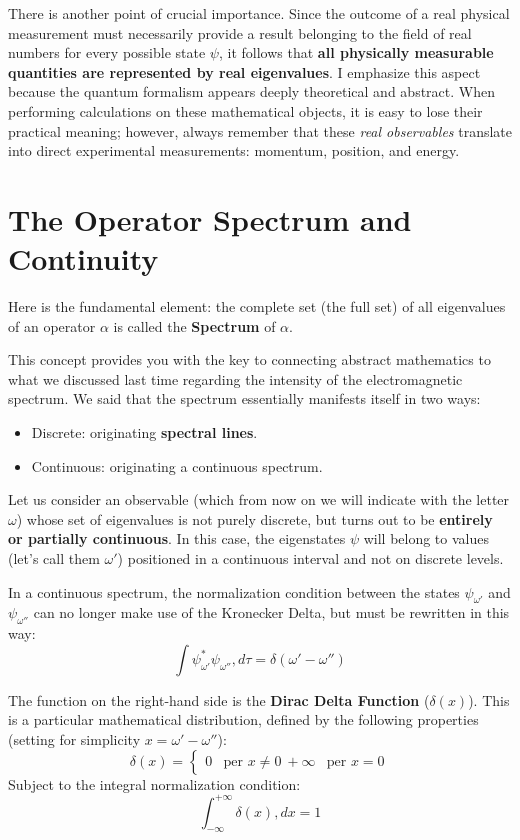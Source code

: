 There is another point of crucial importance. Since the outcome of a real physical measurement must necessarily provide a result belonging to the field of real numbers for every possible state $\psi$, it follows that \textbf{all physically measurable quantities are represented by real eigenvalues}.
I emphasize this aspect because the quantum formalism appears deeply theoretical and abstract. When performing calculations on these mathematical objects, it is easy to lose their practical meaning; however, always remember that these \textit{real observables} translate into direct experimental measurements: momentum, position, and energy.

\section{The Operator Spectrum and Continuity}

Here is the fundamental element: the complete set (the full set) of all eigenvalues of an operator $\alpha$ is called the \textbf{Spectrum} of $\alpha$.

This concept provides you with the key to connecting abstract mathematics to what we discussed last time regarding the intensity of the electromagnetic spectrum. We said that the spectrum essentially manifests itself in two ways:
\begin{itemize}
\item Discrete: originating \textbf{spectral lines}.
\item Continuous: originating a continuous spectrum.
\end{itemize}

Let us consider an observable (which from now on we will indicate with the letter $\omega$) whose set of eigenvalues is not purely discrete, but turns out to be \textbf{entirely or partially continuous}.
In this case, the eigenstates $\psi$ will belong to values (let's call them $\omega'$) positioned in a continuous interval and not on discrete levels.

In a continuous spectrum, the normalization condition between the states $\psi_{\omega'}$ and $\psi_{\omega''}$ can no longer make use of the Kronecker Delta, but must be rewritten in this way:
\begin{equation}
\int \psi_{\omega'}^* \psi_{\omega''} , d\tau = \delta(\omega' - \omega'')
\end{equation}

The function on the right-hand side is the \textbf{Dirac Delta Function} ($\delta(x)$).
This is a particular mathematical distribution, defined by the following properties (setting for simplicity $x = \omega' - \omega''$):
\begin{equation}
\delta(x) =
\begin{cases}
0 & \text{per } x \neq 0 \
+\infty & \text{per } x = 0
\end{cases}
\end{equation}
Subject to the integral normalization condition:
\begin{equation}
\int_{-\infty}^{+\infty} \delta(x) , dx = 1
\end{equation}

